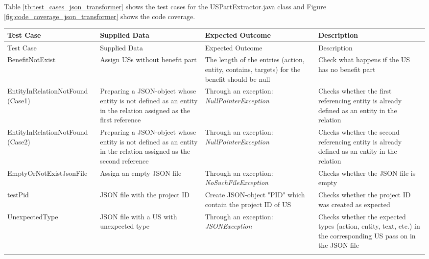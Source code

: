 Table \ref{tb:test_cases_json_transformer} shows the test cases for the USPartExtractor.java class and Figure \ref{fig:code_coverage_json_transformer} shows the code coverage.

\thispagestyle{empty}
\begingroup
\centering
\scriptsize
\renewcommand{\arraystretch}{1,5}
\keepXColumns
	\begin{tabularx}{\textwidth}{X  X  X  X}
	\hline
	Test Case &Supplied Data&Expected Outcome&Description\\
	\hline\hline
	\endfirsthead
	\hline
	Test Case &Supplied Data&Expected Outcome&Description\\
	\hline\hline
	\endhead
		BenefitNotExist&Assign USs without benefit part&The length of the entries (action, entity, contains, targets) for the benefit should be null&Check what happens if the US has no benefit part\\
		
		EntityInRelationNotFound \newline(Case1)&Preparing a JSON-object whose entity is not defined as an entity in the relation assigned as the first reference&Through an exception: \textit{NullPointerException}&Checks whether the first referencing entity is already defined as an entity in the relation\\
		
		
		EntityInRelationNotFound \newline(Case2)&Preparing a JSON-object whose entity is not defined as an entity in the relation assigned as the second reference&Through an exception: \textit{NullPointerException}&Checks whether the second referencing entity is already defined as an entity in the relation\\
		
		EmptyOrNotExistJsonFile&Assign an empty JSON file&Through an exception: \textit{NoSuchFileException}&Checks whether the JSON file is empty\\
		
		testPid&JSON file with the project ID&Create JSON-object "PID" which contain the project ID of US&Checks whether the project ID was created as expected\\
		
		UnexpectedType&JSON file with a US with unexpected type&Through an exception: \textit{JSONException}&Checks whether the expected types (action, entity, text, etc.) in the corresponding US pass on in the JSON file\\
		
		
		\hline
		\caption{Test cases for USPartExtractor  class}\label{tb:test_cases_json_transformer}
	\end{tabularx}
\endgroup

